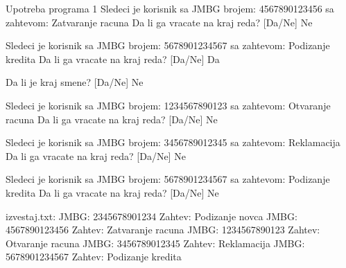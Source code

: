 \begin{Exercise}[label=606]
\begin{maxitest}
\begin{test}{Upotreba programa 1}
Sledeci je korisnik sa JMBG brojem: 4567890123456
sa zahtevom: Zatvaranje racuna
        Da li ga vracate na kraj reda? [Da/Ne] Ne

Sledeci je korisnik sa JMBG brojem: 5678901234567
sa zahtevom: Podizanje kredita
        Da li ga vracate na kraj reda? [Da/Ne] Da

Da li je kraj smene? [Da/Ne] Ne

Sledeci je korisnik sa JMBG brojem: 1234567890123
sa zahtevom: Otvaranje racuna
        Da li ga vracate na kraj reda? [Da/Ne] Ne

Sledeci je korisnik sa JMBG brojem: 3456789012345
sa zahtevom: Reklamacija
        Da li ga vracate na kraj reda? [Da/Ne] Ne

Sledeci je korisnik sa JMBG brojem: 5678901234567
sa zahtevom: Podizanje kredita
        Da li ga vracate na kraj reda? [Da/Ne] Ne

izvestaj.txt: 
  JMBG: 2345678901234     Zahtev: Podizanje novca
  JMBG: 4567890123456     Zahtev: Zatvaranje racuna
  JMBG: 1234567890123     Zahtev: Otvaranje racuna
  JMBG: 3456789012345     Zahtev: Reklamacija
  JMBG: 5678901234567     Zahtev: Podizanje kredita
\end{test}
\end{maxitest}
\end{Exercise}
\begin{Answer}[ref=606]
\end{Answer}

